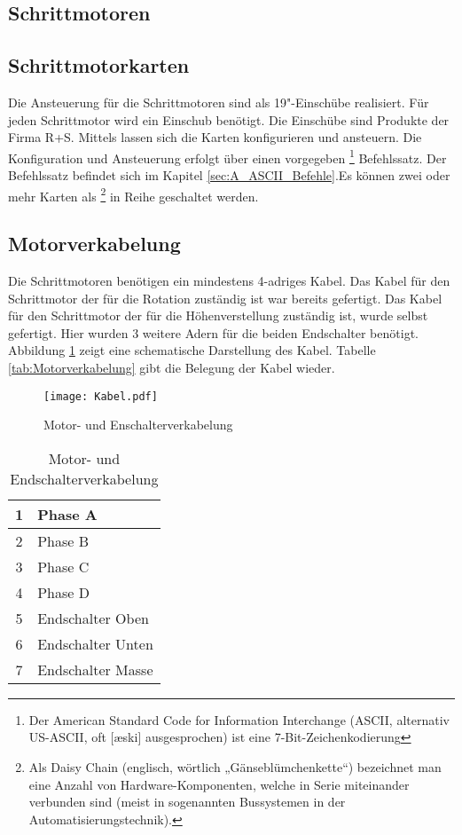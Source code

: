 \subsection{Schrittmotoren}

\subsection{Schrittmotorkarten}
Die Ansteuerung für die Schrittmotoren sind als 19"-Einschübe realisiert. Für jeden Schrittmotor wird ein Einschub benötigt.
Die Einschübe sind Produkte der Firma R+S. Mittels  lassen sich die Karten konfigurieren und ansteuern. Die Konfiguration und Ansteuerung erfolgt über einen vorgegeben 
\footnote{Der American Standard Code for Information Interchange (ASCII, alternativ US-ASCII, oft [æski] ausgesprochen) ist eine 7-Bit-Zeichenkodierung\cite{wiki:ASCII}}
 Befehlssatz. Der Befehlssatz befindet sich im Kapitel \ref{sec:A_ASCII_Befehle}.Es können zwei oder mehr Karten als 
\footnote{Als Daisy Chain (englisch, wörtlich „Gänseblümchenkette“) bezeichnet man eine Anzahl von Hardware-Komponenten, welche in Serie miteinander verbunden sind (meist in sogenannten Bussystemen in der Automatisierungstechnik).\cite{wiki:Daisy} } 
in Reihe geschaltet werden.
\subsection{Motorverkabelung}
Die Schrittmotoren benötigen ein mindestens 4-adriges Kabel. Das Kabel für den Schrittmotor der für die Rotation zuständig ist war bereits gefertigt. Das Kabel für den Schrittmotor der für die Höhenverstellung zuständig ist, wurde selbst gefertigt. Hier wurden 3 weitere Adern für die beiden Endschalter benötigt.\\ Abbildung \ref{fig:Motorverkabelung} zeigt eine schematische Darstellung des Kabel. Tabelle \ref{tab:Motorverkabelung} gibt die Belegung der Kabel wieder.

\begin{figure}[htb]
\centering
\texttt{[image: Kabel.pdf]}
\caption{Motor- und Enschalterverkabelung}
\label{fig:Motorverkabelung}
\end{figure}


\begin{longtable}{|c|l|} 
\caption{Motor- und Endschalterverkabelung} \\
\hline
\label{tab:TD_VI-910}
1 & Phase A \\ 
\hline 
2 & Phase B \\ 
\hline 
3 & Phase C \\ 
\hline 
4 & Phase D \\ 
\hline 
5 & Endschalter Oben \\ 
\hline 
6 & Endschalter Unten \\ 
\hline 
7 & Endschalter Masse \\ 
\hline 
\end{longtable} 
